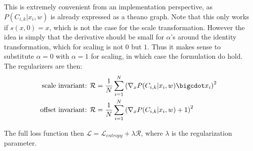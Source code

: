 This is extremely convenient from an implementation perspective, as $P(C_{i, k} | x_i, w)$ is already expressed as a theano graph. Note that this only works if $s(x, 0) = x$, which is not the case for the scale transformation. However the idea is simply that the derivative should be small for $\alpha$'s around the identity transformation, which for scaling is not $0$ but $1$. Thus it makes sense to substitute $\alpha = 0$ with $\alpha = 1$ for scaling, in which case the formulation do hold. The regularizers are then:
\begin{align}
\text{scale invariant: }& \mathcal{R} = \frac{1}{N} \sum_{i=1}^N \left(\nabla_x P(C_{i, k} | x_i, w)\bigcdot x_i\right)^2 \\
\text{offset invariant: }& \mathcal{R} = \frac{1}{N} \sum_{i=1}^N \left(\nabla_x P(C_{i, k} | x_i, w) + 1\right)^2
\end{align}

The full loss function then $\mathcal{L} = \mathcal{L}_{entropy} + \lambda \mathcal{R}$, where $\lambda$ is the regularization parameter.
